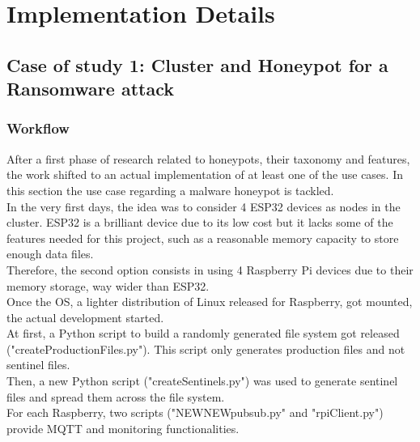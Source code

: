 \chapter{Implementation Details}
\section{Case of study 1: Cluster and Honeypot for a Ransomware attack}

\subsection{Workflow}
After a first phase of research related to honeypots, their taxonomy and features, the work shifted to an actual implementation of at least one of the use cases. In this section the use case regarding a malware honeypot is tackled.\\ 
In the very first days, the idea was to consider 4 ESP32 devices as nodes in the cluster. ESP32 is a brilliant device due to its low cost but it lacks some of the features needed for this project, such as a reasonable memory capacity to store enough data files.\\
Therefore, the second option consists in using 4 Raspberry Pi devices due to their memory storage, way wider than ESP32.\\
Once the OS, a lighter distribution of Linux released for Raspberry, got mounted, the actual development started.\\
At first, a Python script to build a randomly generated file system got released ("createProductionFiles.py"). This script only generates production files and not sentinel files.\\
Then, a new Python script ("createSentinels.py") was used to generate sentinel files and spread them across the file system.\\
For each Raspberry, two scripts ("NEWNEWpubsub.py" and "rpiClient.py") provide MQTT and monitoring functionalities.\\

